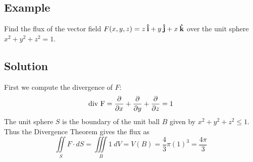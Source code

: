\subsection*{Example}
Find the flux of the vector field $F(x,y,z)=z\:\boldsymbol{\hat{\textbf{i}}}+y\:\boldsymbol{\hat{\textbf{j}}}+x\:\boldsymbol{\hat{\textbf{k}}}$ over the unit
sphere $x^2+y^2+z^2=1$.

\subsection*{Solution}
First we compute the divergence of $F$:
$$\text{div F}=\pdv{}{x}(z)+\pdv{}{y}(y)+\pdv{}{z}(x)=1$$
The unit sphere $S$ is the boundary of the unit ball $B$ given by $x^2+y^2+z^2\leq 1$.
Thus the Divergence Theorem gives the flux as
$$\iint\limits_S F\cdot dS = \iiint\limits_B 1\:dV=V(B)=\frac{4}{3}\pi(1)^3=\frac{4\pi}{3}$$